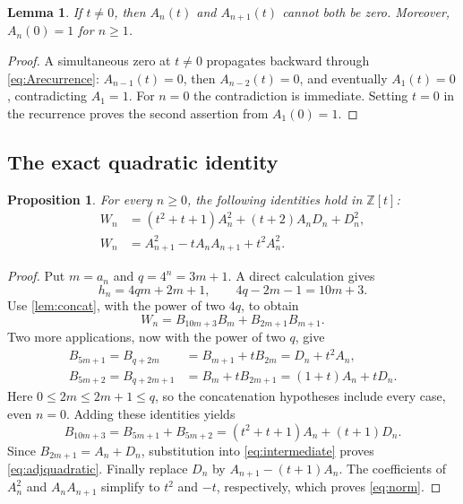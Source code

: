 \documentclass[11pt]{article}
\numberwithin{equation}{section}
\newtheorem{lemma}[theorem]{Lemma}
\newtheorem{proposition}[theorem]{Proposition}
\theoremstyle{definition}
\newcommand{\Z}{\mathbb Z}
\begin{document}
\begin{lemma}\label{lem:commonzero}
If $t\neq0$, then $A_n(t)$ and $A_{n+1}(t)$ cannot both be zero.
Moreover, $A_n(0)=1$ for $n\geq1$.
\end{lemma}
\begin{proof}
A simultaneous zero at $t\neq0$ propagates backward through
\eqref{eq:Arecurrence}: $A_{n-1}(t)=0$, then $A_{n-2}(t)=0$, and eventually
$A_1(t)=0$, contradicting $A_1=1$.
For $n=0$ the contradiction is immediate.  Setting $t=0$ in the recurrence
proves the second assertion from $A_1(0)=1$.
\end{proof}

\subsection{The exact quadratic identity}

\begin{proposition}\label{prop:norm}
For every $n\geq0$, the following identities hold in $\Z[t]$:
\begin{align}
 W_n&=(t^2+t+1)A_n^2+(t+2)A_nD_n+D_n^2,
       \label{eq:adjquadratic}\\
 W_n&=A_{n+1}^2-tA_nA_{n+1}+t^2A_n^2.
       \label{eq:norm}
\end{align}
\end{proposition}
\begin{proof}
Put $m=a_n$ and $q=4^n=3m+1$.  A direct calculation gives
\[
 h_n=4qm+2m+1,\qquad 4q-2m-1=10m+3.
\]
Use \cref{lem:concat}, with the power of two $4q$, to obtain
\begin{equation}\label{eq:intermediate}
 W_n=B_{10m+3}B_m+B_{2m+1}B_{m+1}.
\end{equation}
Two more applications, now with the power of two $q$, give
\begin{align*}
 B_{5m+1}=B_{q+2m}
   &=B_{m+1}+tB_{2m}=D_n+t^2A_n,\\
 B_{5m+2}=B_{q+2m+1}
   &=B_m+tB_{2m+1}=(1+t)A_n+tD_n.
\end{align*}
Here $0\leq2m\leq2m+1\leq q$, so the concatenation hypotheses include
every case, even $n=0$.  Adding these identities yields
\[
 B_{10m+3}=B_{5m+1}+B_{5m+2}
       =(t^2+t+1)A_n+(t+1)D_n.
\]
Since $B_{2m+1}=A_n+D_n$, substitution into
\eqref{eq:intermediate} proves \eqref{eq:adjquadratic}.
Finally replace $D_n$ by $A_{n+1}-(t+1)A_n$.  The coefficients of
$A_n^2$ and $A_nA_{n+1}$ simplify to $t^2$ and $-t$, respectively,
which proves \eqref{eq:norm}.
\end{proof}
\end{document}
